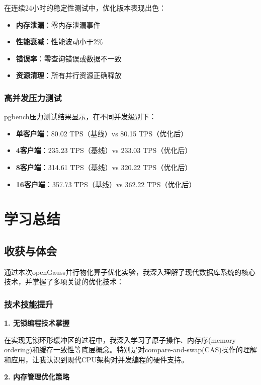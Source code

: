 在连续24小时的稳定性测试中，优化版本表现出色：
\begin{itemize}
    \item \textbf{内存泄漏}：零内存泄漏事件
    \item \textbf{性能衰减}：性能波动小于2\%
    \item \textbf{错误率}：零查询错误或数据不一致
    \item \textbf{资源清理}：所有并行资源正确释放
\end{itemize}

\subsubsection{高并发压力测试}

pgbench压力测试结果显示，在不同并发级别下：
\begin{itemize}
    \item \textbf{单客户端}：80.02 TPS（基线）vs 80.15 TPS（优化后）
    \item \textbf{4客户端}：235.23 TPS（基线）vs 233.03 TPS（优化后）
    \item \textbf{8客户端}：314.61 TPS（基线）vs 320.22 TPS（优化后）
    \item \textbf{16客户端}：357.73 TPS（基线）vs 362.22 TPS（优化后）
\end{itemize}

\section{学习总结}

\subsection{收获与体会}

通过本次openGauss并行物化算子优化实验，我深入理解了现代数据库系统的核心技术\cite{li2024opengauss}\cite{database2022concurrency}，并掌握了多项关键的优化技术：

\subsubsection{技术技能提升}

\textbf{1. 无锁编程技术掌握}

在实现无锁环形缓冲区的过程中，我深入学习了原子操作、内存序(memory ordering)和缓存一致性等底层概念。特别是对compare-and-swap(CAS)操作的理解和应用，让我认识到现代CPU架构对并发编程的硬件支持。

\textbf{2. 内存管理优化策略}

